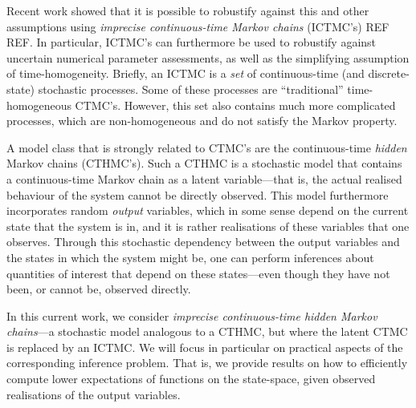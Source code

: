 \documentclass[twoside,11pt]{article}
\begin{document}
Recent work showed that it is possible to robustify against this and other assumptions using \emph{imprecise continuous-time Markov chains} (ICTMC's) REF REF. In particular, ICTMC's can furthermore be used to robustify against uncertain numerical parameter assessments, as well as the simplifying assumption of time-homogeneity. Briefly, an ICTMC is a \emph{set} of continuous-time (and discrete-state) stochastic processes. Some of these processes are ``traditional'' time-homogeneous CTMC's. However, this set also contains much more complicated processes, which are non-homogeneous and do not satisfy the Markov property.

A model class that is strongly related to CTMC's are the continuous-time \emph{hidden} Markov chains (CTHMC's). Such a CTHMC is a stochastic model that contains a continuous-time Markov chain as a latent variable---that is, the actual realised behaviour of the system cannot be directly observed. This model furthermore incorporates random \emph{output} variables, which in some sense depend on the current state that the system is in, and it is rather realisations of these variables that one observes. Through this stochastic dependency between the output variables and the states in which the system might be, one can perform inferences about quantities of interest that depend on these states---even though they have not been, or cannot be, observed directly.



In this current work, we consider \emph{imprecise continuous-time hidden Markov chains}---a stochastic model analogous to a CTHMC, but where the latent CTMC is replaced by an ICTMC. We will focus in particular on practical aspects of the corresponding inference problem. That is, we provide results on how to efficiently compute lower expectations of functions on the state-space, given observed realisations of the output variables.
\end{document}

